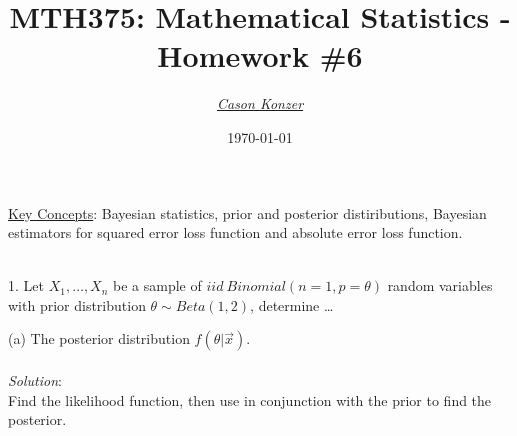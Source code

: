 \documentclass[12pt]{article}
\newcommand{\XB}{\color{black}}
\newcommand{\XBB}{\color{blue}}
\newcommand{\XV}{\color{violet}}
\begin{document}
\title{\textbf{MTH375}: Mathematical Statistics - Homework \#6}
\date{\today}
\author{\XV\textit{\large{\href{https://github.com/casonk}{Cason Konzer}}}\XB}

\maketitle
\hrulefill
\vfill 
    \underline{Key Concepts}: Bayesian statistics, prior and posterior distiributions, 
    Bayesian estimators for squared error loss function and absolute error loss function.

\newpage
\newpage
\XBB\hrulefill\XB \\

1. Let $ X_{1}, \dots , X_{n} $ be a sample of $ iid \ Binomial(n = 1, p = \theta) $ random variables
with prior distribution $ \theta \sim Beta(1, 2) $, determine \dots \\ 

\XBB\hrulefill\XB 
\vspace{5mm}

(a) The posterior distribution $ f(\theta | \overrightarrow{x}) $. \\
\vspace{2.5mm} \\
\textit{Solution}:
\vspace{2.5mm} \\

\noindent
Find the likelihood function, then use in conjunction with the prior to find the posterior. \\
\end{document}
